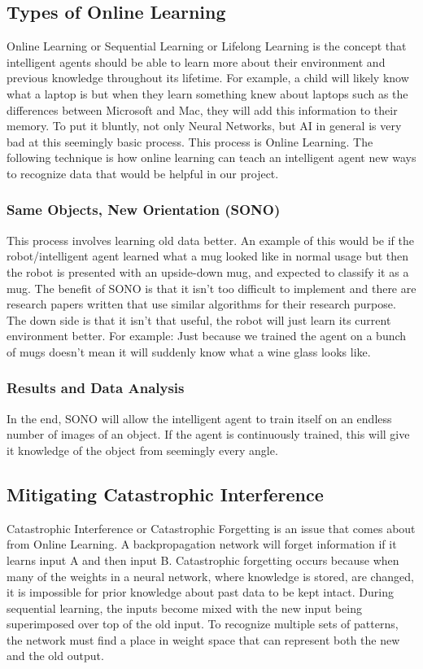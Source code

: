 \documentclass[draftclsnofoot, onecolumn, 10pt, compsoc]{IEEEtran}
\begin{document}
		\subsection{Types of Online Learning}
			Online Learning or Sequential Learning or Lifelong Learning is the concept that intelligent agents should be able to learn more about their environment and previous knowledge throughout its lifetime. For example, a child will likely know what a laptop is but when they learn something knew about laptops such as the differences between Microsoft and Mac, they will add this information to their memory. To put it bluntly, not only Neural Networks, but AI in general is very bad at this seemingly basic process. This process is Online Learning. The following technique is how online learning can teach an intelligent agent new ways to recognize data that would be helpful in our project.

			\subsubsection{Same Objects, New Orientation (SONO)}
				This process involves learning old data better. An example of this would be if the robot/intelligent agent learned what a mug looked like in normal usage but then the robot is presented with an upside-down mug, and expected to classify it as a mug. The benefit of SONO is that it isn’t too difficult to implement and there are research papers written that use similar algorithms for their research purpose. The down side is that it isn’t that useful, the robot will just learn its current environment better. For example: Just because we trained the agent on a bunch of mugs doesn’t mean it will suddenly know what a wine glass looks like.

			\subsubsection{Results and Data Analysis}
				In the end, SONO will allow the intelligent agent to train itself on an endless number of images of an object. If the agent is continuously trained, this will give it knowledge of the object from seemingly every angle.

		\subsection{Mitigating Catastrophic Interference}
			Catastrophic Interference or Catastrophic Forgetting is an issue that comes about from Online Learning. A backpropagation network will forget information if it learns input A and then input B. Catastrophic forgetting occurs because when many of the weights in a neural network, where knowledge is stored, are changed, it is impossible for prior knowledge about past data to be kept intact. During sequential learning, the inputs become mixed with the new input being superimposed over top of the old input. To recognize multiple sets of patterns, the network must find a place in weight space that can represent both the new and the old output.
\end{document}
